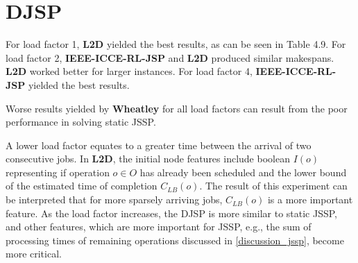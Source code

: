 \section{DJSP}
For load factor 1, \textbf{L2D} yielded the best results, as can be seen in Table 4.9. For load factor 2, \textbf{IEEE-ICCE-RL-JSP} and \textbf{L2D} produced similar makespans. \textbf{L2D} worked better for larger instances. For load factor 4, \textbf{IEEE-ICCE-RL-JSP} yielded the best results. 
\par
Worse results yielded by \textbf{Wheatley} for all load factors can result from the poor performance in solving static JSSP.
\par
A lower load factor equates to a greater time between the arrival of two consecutive jobs. In \textbf{L2D}, the initial node features include boolean $I(o)$ representing if operation $o \in O$ has already been scheduled and the lower bound of the estimated time of completion $C_{LB}(o)$. The result of this experiment can be interpreted that for more sparsely arriving jobs, $C_{LB}(o)$ is a more important feature. As the load factor increases, the DJSP is more similar to static JSSP, and other features, which are more important for JSSP, e.g., the sum of processing times of remaining operations discussed in \ref{discussion_jssp}, become more critical.
